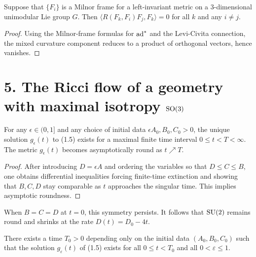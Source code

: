 \begin{lemma}
\label{ch01-lem-curvature-offdiagonal}
Suppose that $\{F_i\}$ is a Milnor frame for a left-invariant metric on a $3$-dimensional unimodular Lie group $G$. Then $\langle R(F_k,F_i)F_j,F_k\rangle = 0$ for all $k$ and any $i\neq j$.
\end{lemma}

\begin{proof}
Using the Milnor-frame formulas for $\operatorname{ad}^*$ and the Levi-Civita connection, the mixed curvature component reduces to a product of orthogonal vectors, hence vanishes.
\end{proof}

\section*{5. The Ricci flow of a geometry with maximal isotropy $\mathrm{SO}(3)$}

\begin{proposition}
\label{ch01-prop-su2-collapse}
For any $\epsilon \in (0,1]$ and any choice of initial data $\epsilon A_0, B_0, C_0 > 0$, the unique solution $g_\epsilon(t)$ to (1.5) exists for a maximal finite time interval $0 \leq t < T < \infty$. The metric $g_\epsilon(t)$ becomes asymptotically round as $t \nearrow T$.
\end{proposition}

\begin{proof}
After introducing $D=\epsilon A$ and ordering the variables so that $D\le C \le B$, one obtains differential inequalities forcing finite-time extinction and showing that $B,C,D$ stay comparable as $t$ approaches the singular time. This implies asymptotic roundness.
\end{proof}

\begin{remark}
\label{ch01-rem-round-sphere}
When $B=C=D$ at $t=0$, this symmetry persists. It follows that $\mathrm{SU}(2)$ remains round and shrinks at the rate $D(t)=D_0-4t$.
\end{remark}

\begin{lemma}
\label{ch01-lem-common-time-interval}
There exists a time $T_0>0$ depending only on the initial data $(A_0,B_0,C_0)$ such that the solution $g_\varepsilon(t)$ of (1.5) exists for all $0\le t<T_0$ and all $0<\varepsilon\le 1$.
\end{lemma}

